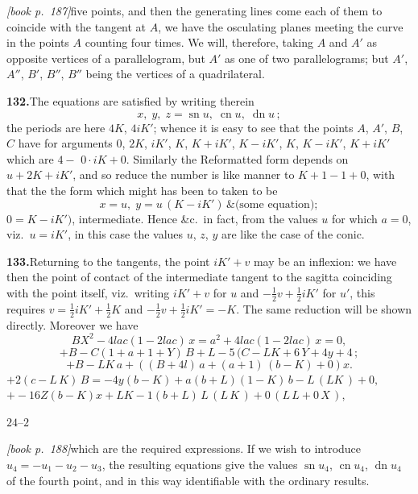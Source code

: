 \documentclass[11pt,a4paper]{article}
\DeclareMathOperator{\sn}{sn}
\DeclareMathOperator{\cn}{cn}
\DeclareMathOperator{\dn}{dn}
\begin{document}
\medskip\noindent\textit{[book p.~187]}\quad five points, and then the generating lines come each of them to coincide with the tangent at $A$, we have the osculating planes meeting the curve in the points $A$ counting four times. We will, therefore, taking $A$ and $A'$ as opposite vertices of a parallelogram, but $A'$ as one of two parallelograms; but $A'$, $A''$, $B'$, $B''$, $B''$ being the vertices of a quadrilateral.

\medskip\noindent\textbf{132.}\quad The equations are satisfied by writing therein
\[
x,\;y,\;z = \sn u,\;\cn u,\;\dn u\,;
\]
the periods are here $4K$, $4iK'$; whence it is easy to see that the points $A$, $A'$, $B$, $C$ have for arguments $0$, $2K$, $iK'$, $K$, $K + iK'$, $K - iK'$, $K$, $K - iK'$, $K + iK'$ which are $4 - $ $0 \cdot iK + 0$. Similarly the Reformatted form depends on $u + 2K + iK'$, and so reduce the number is like manner to $K + 1 - 1 + 0$, with that the the form which might has been to taken to be
\[
x = u,\;y = u\,(K - iK')\,\&\text{(some equation)};
\]
$0 = K - iK')$, intermediate. Hence \&c.\ in fact, from the values $u$ for which $a = 0$, viz.\ $u = iK'$, in this case the values $u$, $z$, $y$ are like the case of the conic.

\medskip\noindent\textbf{133.}\quad Returning to the tangents, the point $iK' + v$ may be an inflexion: we have then the point of contact of the intermediate tangent to the sagitta coinciding with the point itself, viz.\ writing $iK' + v$ for $u$ and $-\tfrac{1}{2}v + \tfrac{1}{2}iK'$ for $u'$, this requires $v = \tfrac{1}{2}iK' + \tfrac{1}{2}K$ and $-\tfrac{1}{2}v + \tfrac{1}{2}iK' = -K$. The same reduction will be shown directly. Moreover we have
\[
B X^2 - 4lac(1 - 2lac)\,x = a^2 + 4lac(1 - 2lac)\,x = 0,
\]
\[
+ B - C(1 + a + 1 + Y)\,B + L - 5\,(C - LK + 6\,Y + 4y + 4\,;
\]
\[
+ B - LK\,a + ((B + 4l)\,a + (a + 1)\,(b - K) + 0)x.
\]
$+ 2(c - L\,K)\,B = -4y(b - K) + a(b + L)(1 - K)\,b - L\,(LK\,) + 0,$
$+ - 16Z(b - K)x + LK - 1(b + L)\,L\,(L\,K\,) + 0\,(L\,L + 0\,X\,)$,

\hfill $24$--$2$

\medskip\noindent\textit{[book p.~188]}\quad which are the required expressions. If we wish to introduce $u_4 = -u_1 - u_2 - u_3$, the resulting equations give the values $\sn u_4$, $\cn u_4$, $\dn u_4$ of the fourth point, and in this way identifiable with the ordinary results.
\end{document}
